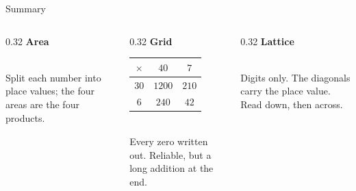 \documentclass[10pt,aspectratio=169]{beamer}
\newcommand{\lgrid}[2]{%
  \foreach \c in {1,...,#1}{%
    \foreach \r in {1,...,#2}{%
      \draw[cellline] ({\c-1},{-\r+1}) rectangle ({\c},{-\r});
      \draw[diagline] ({\c},{-\r+1}) -- ({\c-1},{-\r});}}%
}
\newcommand{\lband}[4]{%
  \begin{scope}
    \clip (0,0) rectangle ({#1},{-#2});
    \fill[#4] ({#3},0) -- ({#3+1},0) -- ({#3-7},-8) -- ({#3-8},-8) -- cycle;
  \end{scope}%
}
\newcommand{\lcell}[4]{%
  \node at ({#1-0.72},{-#2+0.70}) {\small #3};
  \node at ({#1-0.28},{-#2+0.30}) {\small #4};}
\begin{document}
\begin{frame}{Summary}
  \begin{columns}[T]
    \begin{column}{0.32\textwidth}
      \centering
      {\color{mmblue}\bfseries Area}\\[4pt]
      \\[4pt]
      {\scriptsize Split each number into place values; the four areas are the four
       products.}
    \end{column}
    \begin{column}{0.32\textwidth}
      \centering
      {\color{mmblue}\bfseries Grid}\\[4pt]
      {\scriptsize\begin{tabular}{|c|c|c|}\hline
        $\times$&$40$&$7$\\\hline $30$&$1200$&$210$\\\hline $6$&$240$&$42$\\\hline
      \end{tabular}}\\[4pt]
      {\scriptsize Every zero written out. Reliable, but a long addition at the end.}
    \end{column}
    \begin{column}{0.32\textwidth}
      \centering
      {\color{mmblue}\bfseries Lattice}\\[4pt]
      \\[4pt]
      {\scriptsize Digits only. The diagonals carry the place value. Read down,
       then across.}
    \end{column}
  \end{columns}
  \vspace{12pt}
  \begin{center}

\end{center}
\end{frame}
\end{document}
